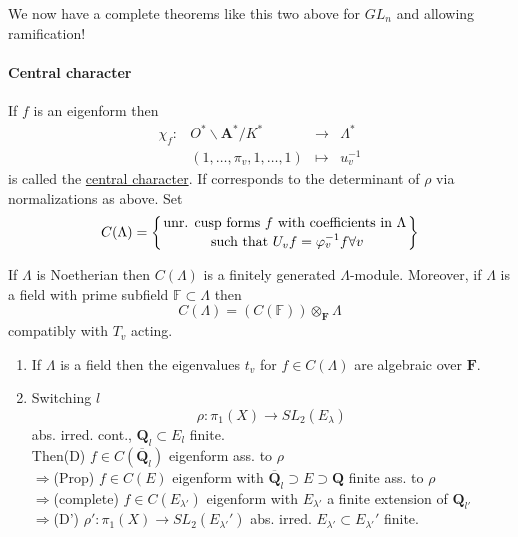 \begin{remark} We now have a complete theorems like this two above for $GL_n$ and allowing ramification!
\end{remark}

\paragraph{Central character} If $f$ is an eigenform then 
	$$\begin{array}{ccccccccc}
	\chi_f:& O^*\backslash \mathbf{A}^*/K^*&\to &\Lambda^*\\
	&(1, \ldots, \pi_v, 1, \ldots, 1)& \mapsto & u_v^{-1}\end{array}$$
	is called the \underline{central character}. If corresponds to the determinant of $\rho$ via normalizations as above. Set
	$$C(\Lambda)=\left\{{\text{unr. cusp forms } f \text{ with coefficients in }\Lambda}\atop {\text{ such that } U_v f = \varphi_v^{-1}f\forall v}\right\}$$
	
\begin{proposition}[dJ. 4.7] If $\Lambda$ is Noetherian then $C(\Lambda)$ is a finitely generated $\Lambda$-module. Moreover, if $\Lambda$ is a field with prime subfield $\mathbb F\subset \Lambda$ then
	$$C(\Lambda)=(C(\mathbb F))\otimes_{\mathbf{F}}\Lambda$$
	compatibly with $T_v$ acting. 
\end{proposition}

\begin{lemma}
\begin{enumerate}
	\item If $\Lambda$ is a field then the eigenvalues $t_v$ for $f\in C(\Lambda)$ are algebraic over $\mathbf{F}$. 
	\item Switching $l$
	$$\rho: \pi_1(X)\to SL_2(E_\lambda)$$
	abs. irred. cont., $\mathbf{Q}_l\subset E_l$ finite. \\
	Then(D) $f\in C(\overline{\mathbf{Q}}_l)$ eigenform ass. to $\rho$\\
	$\Rightarrow$(Prop) $f\in C(E)$ eigenform with $\overline{\mathbf{Q}}_l\supset E\supset \mathbf{Q}$ finite ass. to $\rho$\\
	$\Rightarrow$(complete) $f\in C(E_{\lambda'})$ eigenform with $E_{\lambda'}$ a finite extension of $\mathbf{Q}_{l'}$\\
	$\Rightarrow$(D') $\rho': \pi_1(X)\to SL_2(E_{\lambda'}')$ abs. irred. $E_{\lambda'}\subset E_{\lambda'}'$ finite. 
\end{enumerate}
\end{lemma}

